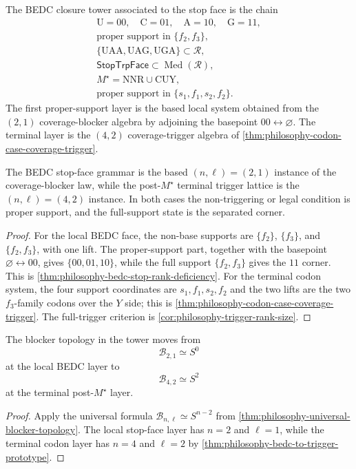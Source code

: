 \begin{definition}
\label{def:philosophy-bedc-closure-tower}
The BEDC closure tower associated to the stop face is the chain
$$
\begin{gathered}
  \mathrm{U}=00,\quad \mathrm{C}=01,\quad
  \mathrm{A}=10,\quad \mathrm{G}=11,\\
  \text{proper support in }\{f_{2},f_{3}\},\\
  \{\mathrm{UAA},\mathrm{UAG},\mathrm{UGA}\}
  \subset \mathcal{R},\\
  \mathsf{StopTrpFace}\subset \operatorname{Med}(\mathcal{R}),\\
  M^{\star}=\mathrm{NNR}\cup\mathrm{CUY},\\
  \text{proper support in }\{s_{1},f_{1},s_{2},f_{2}\}.
\end{gathered}
$$
The first proper-support layer is the based local system obtained from
the $(2,1)$ coverage-blocker algebra by adjoining the basepoint
$00\leftrightarrow\varnothing$. The terminal layer is the $(4,2)$
coverage-trigger algebra of
\autoref{thm:philosophy-codon-case-coverage-trigger}.
\end{definition}

\begin{theorem}
\label{thm:philosophy-bedc-to-trigger-prototype}
The BEDC stop-face grammar is the based $(n,\ell)=(2,1)$ instance of the
coverage-blocker law, while the post-$M^{\star}$ terminal trigger lattice
is the $(n,\ell)=(4,2)$ instance. In both cases the non-triggering or
legal condition is proper support, and the full-support state is the
separated corner.
\end{theorem}
\begin{proof}
For the local BEDC face, the non-base supports are
$\{f_{2}\}$, $\{f_{3}\}$, and $\{f_{2},f_{3}\}$, with one lift. The
proper-support part, together with the basepoint
$\varnothing\leftrightarrow 00$, gives
$\{00,01,10\}$, while the full support $\{f_{2},f_{3}\}$ gives the
$11$ corner. This is \autoref{thm:philosophy-bedc-stop-rank-deficiency}.
For the terminal codon system, the four support coordinates are
$s_{1},f_{1},s_{2},f_{2}$ and the two lifts are the two $f_{3}$-family
codons over the $Y$ side; this is
\autoref{thm:philosophy-codon-case-coverage-trigger}. The full-trigger
criterion is \autoref{cor:philosophy-trigger-rank-size}.
\end{proof}

\begin{corollary}
\label{cor:philosophy-bedc-closure-tower-topology}
The blocker topology in the tower moves from
$$
  \mathcal{B}_{2,1}\simeq S^{0}
$$
at the local BEDC layer to
$$
  \mathcal{B}_{4,2}\simeq S^{2}
$$
at the terminal post-$M^{\star}$ layer.
\end{corollary}
\begin{proof}
Apply the universal formula
$\mathcal{B}_{n,\ell}\simeq S^{n-2}$ from
\autoref{thm:philosophy-universal-blocker-topology}. The local stop-face
layer has $n=2$ and $\ell=1$, while the terminal codon layer has
$n=4$ and $\ell=2$ by
\autoref{thm:philosophy-bedc-to-trigger-prototype}.
\end{proof}

